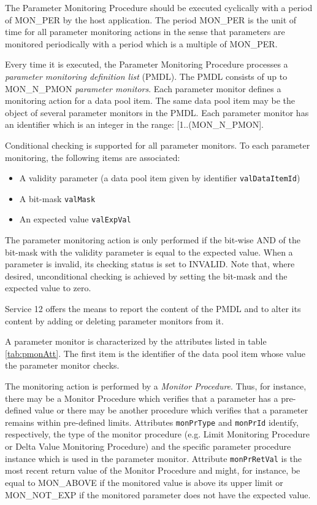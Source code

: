 \documentclass{pnp_article}
\begin{document}
The Parameter Monitoring Procedure should be executed cyclically with a period of MON\_PER by the host application. The period MON\_PER is the unit of time for all parameter monitoring actions in the sense that parameters are monitored periodically with a period which is a multiple of MON\_PER.

Every time it is executed, the Parameter Monitoring Procedure processes a \textit{parameter monitoring definition list} (PMDL). The PMDL consists of up to MON\_N\_PMON \textit{parameter monitors}. Each parameter monitor defines a monitoring action for a data pool item. The same data pool item may be the object of several parameter monitors in the PMDL. Each parameter monitor has an identifier which is an integer in the range: [1..(MON\_N\_PMON].

Conditional checking is supported for all parameter monitors. To each parameter monitoring, the following items are associated: 

\begin{itemize}
\item A validity parameter (a data pool item given by identifier \texttt{valDataItemId})
\item A bit-mask \texttt{valMask}
\item An expected value \texttt{valExpVal}
\end{itemize}

The parameter monitoring action is only performed if the bit-wise AND of the bit-mask with the validity parameter is equal to the expected value. When a parameter is invalid, its checking status is set to INVALID. Note that, where desired, unconditional checking is achieved by setting the bit-mask and the expected value to zero.

Service 12 offers the means to report the content of the PMDL and to alter its content by adding or deleting parameter monitors from it.

A parameter monitor is characterized by the attributes listed in table \ref{tab:pmonAtt}. The first item is the identifier of the data pool item whose value the parameter monitor checks. 

The monitoring action is performed by a \textit{Monitor Procedure}. Thus, for instance, there may be a Monitor Procedure which verifies that a parameter has a pre-defined value or there may be another procedure which verifies that a parameter remains within pre-defined limits. Attributes \texttt{monPrType} and \texttt{monPrId} identify, respectively, the type of the monitor procedure (e.g. Limit Monitoring Procedure or Delta Value Monitoring Procedure) and the specific parameter procedure instance which is used in the parameter monitor. Attribute \texttt{monPrRetVal} is the most recent return value of the Monitor Procedure and might, for instance, be equal to MON\_ABOVE if the monitored value is above its upper limit or MON\_NOT\_EXP if the monitored parameter does not have the expected value.
\end{document}
